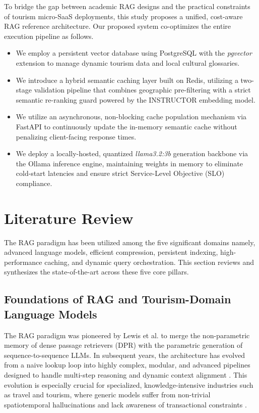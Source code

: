\documentclass{ieeeaccess}
\begin{document}
To bridge the gap between academic RAG designs and the practical constraints of tourism micro-SaaS deployments, this study proposes a unified, cost-aware RAG reference architecture. Our proposed system co-optimizes the entire execution pipeline as follows.
\begin{itemize}
    \item We employ a persistent vector database using PostgreSQL with the \emph{pgvector} extension to manage dynamic tourism data and local cultural glossaries.
    \item We introduce a hybrid semantic caching layer built on Redis, utilizing a two-stage validation pipeline that combines geographic pre-filtering with a strict semantic re-ranking guard powered by the INSTRUCTOR embedding model.
    \item We utilize an asynchronous, non-blocking cache population mechanism via FastAPI to continuously update the in-memory semantic cache without penalizing client-facing response times.
    \item We deploy a locally-hosted, quantized \emph{llama3.2:3b} generation backbone via the Ollama inference engine, maintaining weights in memory to eliminate cold-start latencies and ensure strict Service-Level Objective (SLO) compliance.
\end{itemize}

\section{Literature Review}
The RAG paradigm has been utilized among the five significant domains namely, advanced language models, efficient compression, persistent indexing, high-performance caching, and dynamic query orchestration. This section reviews and synthesizes the state-of-the-art across these five core pillars.

\subsection{Foundations of RAG and Tourism-Domain Language Models}
The RAG paradigm was pioneered by Lewis et al. \cite{lewis-rag-2020} to merge the non-parametric memory of dense passage retrievers (DPR) with the parametric generation of sequence-to-sequence LLMs. In subsequent years, the architecture has evolved from a naive lookup loop into highly complex, modular, and advanced pipelines designed to handle multi-step reasoning and dynamic context alignment \cite{gao-rag-survey-2023, gao-survey-2024}. This evolution is especially crucial for specialized, knowledge-intensive industries such as travel and tourism, where generic models suffer from non-trivial spatiotemporal hallucinations and lack awareness of transactional constraints \cite{gu-survey-2024, tourllm-2024}.
\end{document}
